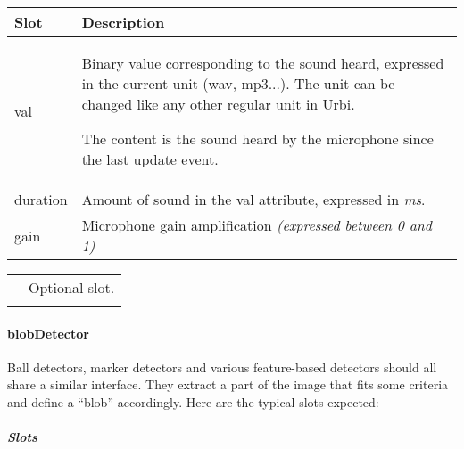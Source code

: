 \documentclass[a4paper]{article}
\begin{document}
\begin{flushleft}
\tablehead{}
\begin{supertabular}{|m{3.293cm}|m{11.997cm}|}
\hline
\sffamily\bfseries Slot &
\sffamily\bfseries Description\\\hline
val &
{\sffamily Binary value corresponding to the
sound heard, expressed in the current unit (wav, mp3...). The unit can
be changed like any other regular unit in Urbi. }

\textsf{The content is the sound heard by the
microphone since the last }update\textsf{ event.}\\\hline
duration &
\textsf{Amount of sound in the }val\textsf{
attribute, expressed in }\textsf{\textit{ms}}\textsf{.}\\\hline
gain &
\textsf{Microphone gain amplification
}\textsf{\textit{(expressed between 0 and 1)}}\\\hline
\end{supertabular}
\end{flushleft}
\begin{flushleft}
\tablehead{}
\begin{supertabular}{|m{1.717cm}|m{10.464cm}}
\hhline{-~}
 &
\sffamily Optional slot.\\\hhline{-~}
\end{supertabular}
\end{flushleft}
\paragraph{blobDetector}

{\sffamily
Ball detectors, marker detectors and various feature-based detectors
should all share a similar interface. They extract a part of the image
that fits some criteria and define a “blob” accordingly. Here are the
typical slots expected:}

\subparagraph{Slots}
\end{document}
